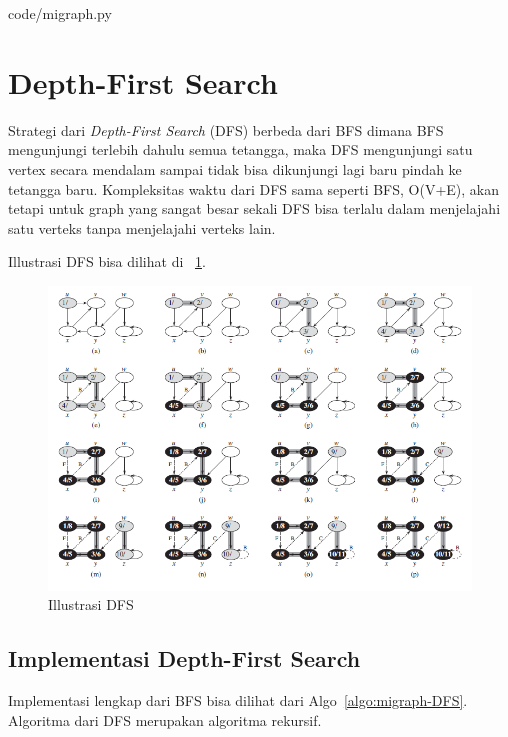 
                {code/migraph.py}
								
\section{Depth-First Search}

Strategi dari \textit{Depth-First Search} (DFS) berbeda dari BFS dimana BFS mengunjungi terlebih dahulu semua tetangga, maka DFS mengunjungi satu vertex secara mendalam sampai tidak bisa dikunjungi lagi baru pindah ke tetangga baru. Kompleksitas waktu dari DFS sama seperti BFS, O(V+E), akan tetapi untuk graph yang sangat besar sekali DFS bisa terlalu dalam menjelajahi satu verteks tanpa menjelajahi verteks lain.

Illustrasi DFS bisa dilihat di ~\ref{fig:Dfs}.

\begin{figure}
    \includegraphics[width=\textwidth,keepaspectratio]{fig/DFS.png}%
	\caption{Illustrasi DFS}%
	\label{fig:Dfs}%
\end{figure}


\subsection{Implementasi Depth-First Search}

Implementasi lengkap dari BFS bisa dilihat dari Algo~\ref{algo:migraph-DFS}. Algoritma dari DFS merupakan algoritma rekursif.

